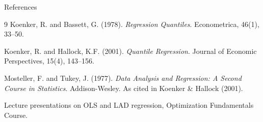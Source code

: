 \documentclass{beamer}
\begin{document}
\begin{frame}{References}
	\begin{thebibliography}{9}
		Koenker, R. and Bassett, G. (1978).
		\textit{Regression Quantiles}.
		Econometrica, 46(1), 33--50.

		Koenker, R. and Hallock, K.F. (2001).
		\textit{Quantile Regression}.
		Journal of Economic Perspectives, 15(4), 143--156.

		Mosteller, F. and Tukey, J. (1977).
		\textit{Data Analysis and Regression: A Second Course in Statistics}.
		Addison-Wesley. As cited in Koenker \& Hallock (2001).

		Lecture presentations on OLS and LAD regression, Optimization Fundamentals Course.
	\end{thebibliography}
\end{frame}
\end{document}
